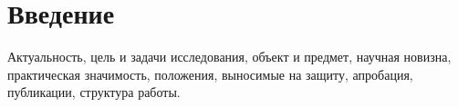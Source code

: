 \chapter*{Введение}
Актуальность, цель и задачи исследования, объект и предмет, научная новизна, практическая значимость, положения, выносимые на защиту, апробация, публикации, структура работы.


